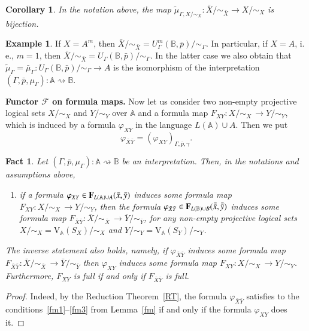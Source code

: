 \documentclass[12pt]{article}
\newtheorem{fact}{Fact}
\newtheorem{corollary}{Corollary}
\theoremstyle{definition}
\newtheorem{example}{Example}
\def\MA{{\mathbb{A}}}
\def\MB{{\mathbb{B}}}
\def\F{{\mathcal{F}}}
\def\V{{\mathrm{V}}}
\begin{document}
\begin{corollary}\label{cor3}
In the notation above, the map $\tilde\mu_{\Gamma,X/{\sim_X}}\colon \bar X/{\sim_{\bar X}} \to X/{\sim_X}$ is bijection.
\end{corollary}

\begin{example}\label{ex:Gamma}
If $X=A^m$, then $\bar X/{\sim_{\bar X}}=U_\Gamma^m(\MB,\bar p)/{\sim_\Gamma}$. In particular,  if $X=A$, i.\,e., $m=1$, then $\bar X/{\sim_{\bar X}}=U_\Gamma(\MB,\bar p)/{\sim_\Gamma}$. In the latter case we also obtain that $\tilde\mu_\Gamma=\bar\mu_\Gamma\colon U_\Gamma(\MB,\bar p)/{\sim_\Gamma}\to A$ is the isomorphism of the interpretation $(\Gamma,\bar p,\mu_\Gamma)\colon\MA\rightsquigarrow\MB$. 
\end{example}

{\bf Functor $\F$ on formula maps.} Now let us consider two non-empty projective logical sets $X/{\sim_X}$ and $Y/{\sim_Y}$ over $\MA$ and a formula map $F_{XY}\colon X/{\sim_X}\, \to Y/{\sim_Y}$, which is induced by a formula $\varphi_{XY}$ in the language $L(\MA)\cup A$. Then we put 
$$
\varphi_{\bar X \bar Y}=(\varphi_{XY})_{\Gamma, \bar p, \gamma}.
$$

\begin{fact}\label{fact14}
Let $(\Gamma,\bar p,\mu_\Gamma)\colon\MA\rightsquigarrow\MB$ be an interpretation. Then, in the notations and assumptions above, 
\begin{enumerate}[label=(F\arabic*)]\addtocounter{enumi}{4}
    \item\label{F5} if a formula $\varphi_{XY}\in {\bf F}_{L(\MA)\cup A}(\bar x,\bar y)$ induces some formula map $F_{XY}\colon X/{\sim_X}\, \to Y/{\sim_Y}$, then the formula $\varphi_{\bar X \bar Y}\in {\bf F}_{L(\MB)\cup B}(\bar {\bar x},\bar {\bar y})$ induces some formula map $F_{\bar X \bar Y}\colon \bar X/{\sim_{\bar X}} \,\to \bar Y/{\sim_{\bar Y}}$, for any non-empty projective logical sets $X/{\sim_X}=\V_\MA(S_X)/{\sim_X}$ and $Y/{\sim_Y}=\V_\MA(S_Y)/{\sim_Y}$.
\end{enumerate}
The inverse statement also holds, namely, if $\varphi_{\bar X \bar Y}$ induces some formula map $F_{\bar X \bar Y}\colon \bar X/{\sim_{\bar X}} \,\to \bar Y/{\sim_{\bar Y}}$ then $\varphi_{XY}$ induces some formula map $F_{XY}\colon X/{\sim_X}\, \to Y/{\sim_Y}$. Furthermore, $F_{XY}$ is full if and only if $F_{\bar X \bar Y}$ is full.
\end{fact}

\begin{proof}
Indeed, by the Reduction Theorem~\ref{RT}, the formula $\varphi_{\bar X \bar Y}$ satisfies to the conditions~\ref{fm1}--\ref{fm3} from Lemma~\ref{fm} if and only if the formula $\varphi_{X Y}$ does it.  
\end{proof} 
\end{document}

